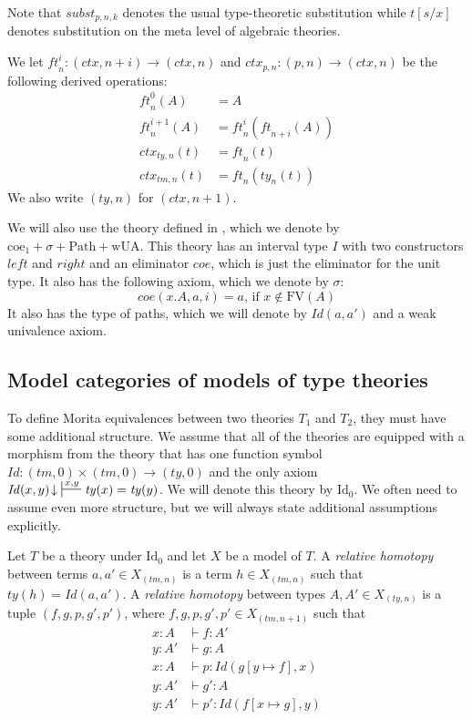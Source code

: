\documentclass[reqno]{amsart}
\theoremstyle{definition}
\theoremstyle{remark}
\newcommand{\FV}{\mathrm{FV}}
\newcommand{\IdT}{\mathrm{Id}}
\newcommand{\wUA}{\mathrm{wUA}}
\newcommand{\coeT}{\mathrm{coe}}
\newcommand{\PathT}{\mathrm{Path}}
\newcommand{\Id}{\mathit{Id}}
\newcommand{\coe}{\mathit{coe}}
\newcommand{\subst}{\mathit{subst}}
\newcommand{\ft}{\mathit{ft}}
\newcommand{\ty}{\mathit{ty}}
\newcommand{\ctx}{\mathit{ctx}}
\newcommand{\tm}{\mathit{tm}}
\numberwithin{figure}{section}
\begin{document}
Note that $\subst_{p,n,k}$ denotes the usual type-theoretic substitution while $t[s/x]$ denotes substitution on the meta level of algebraic theories.

We let $\ft^i_n : (\ctx,n+i) \to (\ctx,n)$ and $\ctx_{p,n} : (p,n) \to (\ctx,n)$ be the following derived operations:
\begin{align*}
\ft^0_n(A)      & = A \\
\ft^{i+1}_n(A)  & = \ft^i_n(\ft_{n+i}(A)) \\
\ctx_{\ty,n}(t) & = \ft_n(t) \\
\ctx_{\tm,n}(t) & = \ft_n(\ty_n(t))
\end{align*}
We also write $(\ty,n)$ for $(\ctx,n+1)$.

We will also use the theory defined in \cite{alg-models}, which we denote by $\coeT_1 + \sigma + \PathT + \wUA$.
This theory has an interval type $I$ with two constructors $left$ and $right$ and an eliminator $\coe$, which is just the eliminator for the unit type.
It also has the following axiom, which we denote by $\sigma$:
\[ \coe(x.A, a, i) = a \text{, if } x \notin \FV(A) \]
It also has the type of paths, which we will denote by $\Id(a,a')$ and a weak univalence axiom.

\subsection{Model categories of models of type theories}

To define Morita equivalences between two theories $T_1$ and $T_2$, they must have some additional structure.
We assume that all of the theories are equipped with a morphism from the theory that has one function symbol
$\Id : (\tm,0) \times (\tm,0) \to (\ty,0)$ and the only axiom $\Id(x,y)\!\downarrow\ \sststile{}{x,y} \ty(x) = \ty(y)$.
We will denote this theory by $\IdT_0$.
We often need to assume even more structure, but we will always state additional assumptions explicitly.

Let $T$ be a theory under $\IdT_0$ and let $X$ be a model of $T$.
A \emph{relative homotopy} between terms $a,a' \in X_{(\tm,n)}$ is a term $h \in X_{(\tm,n)}$ such that $\ty(h) = \Id(a,a')$.
A \emph{relative homotopy} between types $A,A' \in X_{(\ty,n)}$ is a tuple $(f,g,p,g',p')$, where $f,g,p,g',p' \in X_{(\tm,n+1)}$ such that
\begin{align*}
x : A & \vdash f : A' \\
y : A' & \vdash g : A \\
x : A & \vdash p : \Id(g[y \mapsto f], x) \\
y : A' & \vdash g' : A \\
y : A' & \vdash p' : \Id(f[x \mapsto g], y)
\end{align*}
\end{document}
